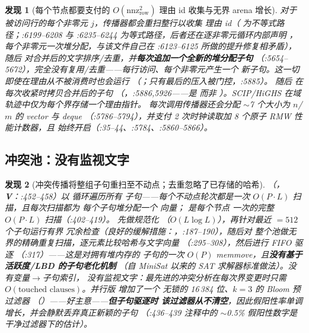 \documentclass[11pt]{ctexart}
\newtheorem{finding}{发现}
\newcommand{\nnz}{\mathrm{nnz}}
\begin{document}
\begin{finding}[每个节点都要支付的 $O(\nnz_{\mathrm{row}}^2)$ 理由 id 收集与无界 arena 增长]
\label{find:reason-arena}
对于被访问行的\emph{每个非零元 $j$}，传播器都会重扫\emph{整行}以收集
理由 id（ 为不等式路径；:6199--6208 与
:6235--6244 为等式路径，后者还在逐非零元循环\emph{内部}声明
，每个非零元一次堆分配，与该文件自己在
:6123--6125 所做的提升修复相矛盾），随后 
对合并后的文字排序/去重，并\textbf{每次追加一个全新的堆分配子句}
（:5654--5672），完全没有复用/去重——每行访问、每个非零元产生一个
新子句。这一切\emph{即使在理由从不被消费时}也会运行
（；只有最后的压入被门控，:5885）。
随后  在每次收紧时拷贝合并后的子句
（，:5886,5926——是  而非
）。SCIP/HiGHS 在域轨迹中仅为每个界存储一个理由\emph{指针}。
每次调用传播器还会分配 $\sim$7 个大小为 $n$/$m$ 的 vector 与 deque
（:5786--5794），并支付 2 次时钟读取加 8 个原子 RMW 性能计数器，且
始终开启（:35--44、:5784、:5860--5866）。
\end{finding}

\subsection{冲突池：没有监视文字}
\begin{finding}[冲突传播将整组子句重扫至不动点；去重忽略了已存储的哈希]
\label{find:conflict-pool}
（，
\textbf{V}：:452--458）以  循环遍历\emph{所有}
子句——每个不动点轮次都是一次 $O(P \cdot L)$ 扫描，且每次扫描都为
每个子句堆分配一个  向量； 是每个节点
一次的完整 $O(P \cdot L)$ 扫描（:402--419）。 先做规范化
（$O(L \log L)$），再针对最近 $=512$ 个子句运行有界
冗余检查（良好的缓解措施：，:187--190），随后对
\emph{整个}池做\emph{无界}的精确重复扫描，逐元素比较哈希与文字向量
（:295--308），然后进行 FIFO 驱逐
（:317）——这是对拥有堆内存的
子句的一次 $O(P)$ memmove，且\textbf{没有基于活跃度/LBD 的子句老化机制}
（自 MiniSat 以来的 SAT 求解器标准做法）。没有变量$\to$子句索引，
没有监视文字：最先进的冲突分析在每次界变更时只需
$O(\text{touched clauses})$。并行版  增加了一个
无锁的 16\,384 位、$k{=}3$ 的 Bloom 预过滤器
（）——好主意——\textbf{但子句驱逐时
该过滤器从不清空}，因此假阳性率单调增长，并会静默丢弃真正新颖的子句
（:436--439 注释中的 $\sim$0.5\% 假阳性数字是\emph{干净过滤器}下的估计）。
\end{finding}
\end{document}
